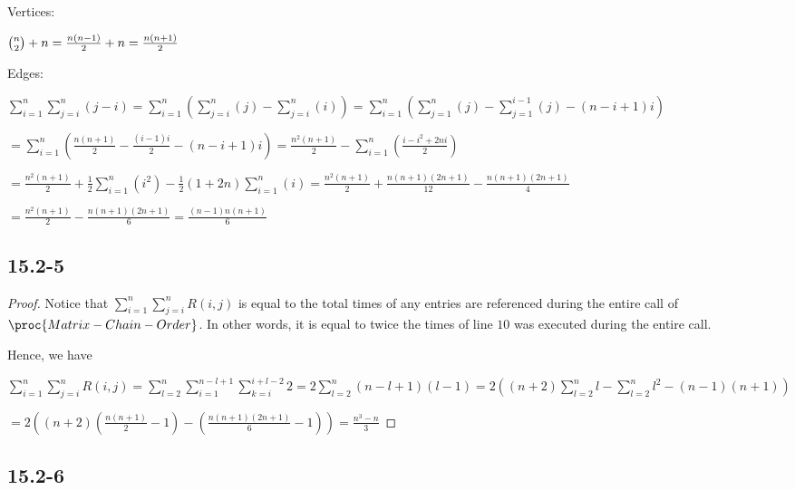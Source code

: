 \noindent
Vertices: 

$\tbinom{n}{2} + n = \frac{n(n-1)}{2} + n = \frac{n(n+1)}{2}$

\noindent
Edges: 

$\sum\limits_{i=1}^{n}\sum\limits_{j=i}^{n}(j-i)
= \sum\limits_{i=1}^{n}(\sum\limits_{j=i}^{n}(j)-\sum\limits_{j=i}^{n}(i))
= \sum\limits_{i=1}^{n}(\sum\limits_{j=1}^{n}(j)-\sum\limits_{j=1}^{i-1}(j)-(n-i+1)i)$

$= \sum\limits_{i=1}^{n}(\frac{n(n+1)}{2}-\frac{(i-1)i}{2}-(n-i+1)i)
= \frac{n^2(n+1)}{2}-\sum\limits_{i=1}^{n}(\frac{i-i^2+2ni}{2})$

$= \frac{n^2(n+1)}{2}+\frac{1}{2}\sum\limits_{i=1}^{n}(i^2)-\frac{1}{2}(1+2n)\sum\limits_{i=1}^{n}(i)
= \frac{n^2(n+1)}{2}+\frac{n(n+1)(2n+1)}{12}-\frac{n(n+1)(2n+1)}{4}$

$= \frac{n^2(n+1)}{2}-\frac{n(n+1)(2n+1)}{6}
= \frac{(n-1)n(n+1)}{6}$

\subsection*{15.2-5}

\begin{proof}
    \noindent
    Notice that 
    $\sum\limits_{i=1}^{n}\sum\limits_{j=i}^{n}R(i,j)$ 
    is equal to the total times of any entries are referenced 
    during the entire call of $\proc{Matrix-Chain-Order}$.
    In other words, it is equal to twice the times of line $10$ 
    was executed during the entire call.

    \noindent
    Hence, we have

    $\sum\limits_{i=1}^{n}\sum\limits_{j=i}^{n}R(i,j)
    = \sum\limits_{l=2}^{n}\sum\limits_{i=1}^{n-l+1}\sum\limits_{k=i}^{i+l-2}2
    = 2\sum\limits_{l=2}^{n}(n-l+1)(l-1)
    = 2((n+2)\sum\limits_{l=2}^{n}l-\sum\limits_{l=2}^{n}l^2-(n-1)(n+1))$
    
    $= 2((n+2)(\frac{n(n+1)}{2}-1)-(\frac{n(n+1)(2n+1)}{6}-1))
    = \frac{n^3-n}{3}$
\end{proof}

\subsection*{15.2-6}

